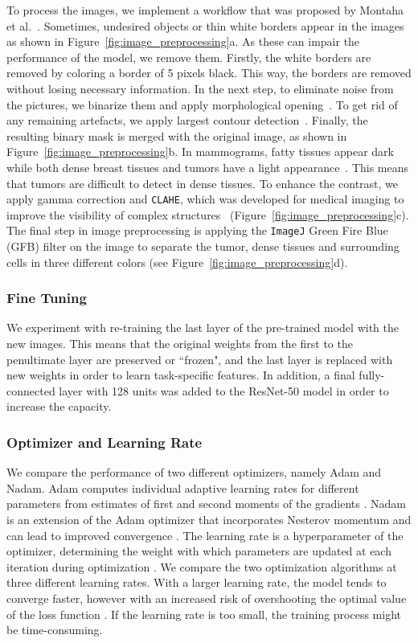 \documentclass[sn-mathphys,Numbered]{sn-jnl}%
\theoremstyle{thmstyleone}%
\theoremstyle{thmstyletwo}%
\theoremstyle{thmstylethree}%
\begin{document}
\noindent To process the images, we implement a workflow that was proposed by Montaha et al.~\cite{Montaha2021}. Sometimes, undesired objects or thin white borders appear in the images as shown in Figure~\ref{fig:image_preprocessing}a. As these can impair the performance of the model, we remove them. Firstly, the white borders are removed by coloring a border of 5 pixels black. This way, the borders are removed without losing necessary information. In the next step, to eliminate noise from the pictures, we binarize them and apply morphological opening~\cite{morph}. To get rid of any remaining artefacts, we apply largest contour detection~\cite{contours}. Finally, the resulting binary mask is merged with the original image, as shown in Figure~\ref{fig:image_preprocessing}b. In mammograms, fatty tissues appear dark while both dense breast tissues and tumors have a light appearance~\cite{Montaha2021}. This means that tumors are difficult to detect in dense tissues. To enhance the contrast, we apply gamma correction and \verb|CLAHE|, which was developed for medical imaging to improve the visibility of complex structures~\cite{Montaha2021} (Figure~\ref{fig:image_preprocessing}c). The final step in image preprocessing is applying the \verb|ImageJ| Green Fire Blue (GFB) filter on the image to separate the tumor, dense tissues and surrounding cells in three different colors (see Figure~\ref{fig:image_preprocessing}d).
\subsubsection{Fine Tuning}
\label{finetuning}
We experiment with re-training the last layer of the pre-trained model with the new images. This means that the original weights from the first to the penultimate layer are preserved or ``frozen", and the last layer is replaced with new weights in order to learn task-specific features. In addition, a final fully-connected layer with 128 units was added to the ResNet-50 model in order to increase the capacity.
\subsubsection{Optimizer and Learning Rate}
\label{learningrate}
We compare the performance of two different optimizers, namely Adam and Nadam. Adam computes individual adaptive learning rates for different parameters from estimates of first and second moments of the gradients \cite{kingma2017adam}. Nadam is an extension of the Adam optimizer that incorporates Nesterov momentum and can lead to improved convergence \cite{dozat.2016}.
The learning rate is a hyperparameter of the optimizer, determining the weight with which parameters are updated at each iteration during optimization \cite{Brownlee_2020}. We compare the two optimization algorithms at three different learning rates. With a larger learning rate, the model tends to converge faster, however with an increased risk of overshooting the optimal value of the loss function \cite{Brownlee_2020}. If the learning rate is too small, the training process might be time-consuming.
\end{document}
